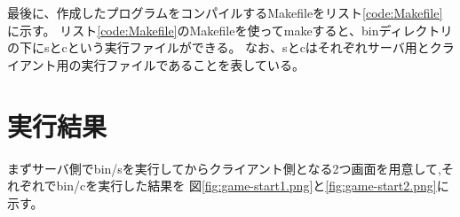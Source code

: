 \documentclass[a4j, titlepage, 10pt]{jsarticle}
\begin{document}
最後に、作成したプログラムをコンパイルするMakefileをリスト\ref{code:Makefile}に示す。
リスト\ref{code:Makefile}のMakefileを使ってmakeすると、binディレクトリの下にsとcという実行ファイルができる。
なお、sとcはそれぞれサーバ用とクライアント用の実行ファイルであることを表している。

\lstset{ numbers = left }



\section{実行結果}

まずサーバ側でbin/sを実行してからクライアント側となる2つ画面を用意して,それぞれでbin/cを実行した結果を
図\ref{fig:game-start1.png}と\ref{fig:game-start2.png}に示す。

\end{document}
